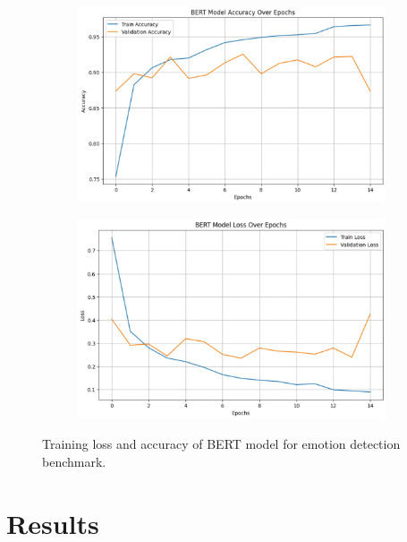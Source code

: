 \documentclass[conference]{IEEEtran}
\begin{document}
\begin{figure}[!htbp]
\centering
\captionsetup[subfigure]{justification=centering}
\captionsetup{justification=centering}

  \begin{subfigure}{0.48\linewidth}
  \centering
    \includegraphics[width=\linewidth]{bert_acc.jpg}
    \caption{}
    \label{plots:2-a}
  \end{subfigure}
  \hfill
  \begin{subfigure}{0.48\linewidth}
  \centering
    \includegraphics[width=\linewidth]{bert_loss.jpg}
    \caption{}
    \label{plots:2-b}
  \end{subfigure}

  \caption{Training loss and accuracy of BERT model for emotion detection benchmark.}
  \label{fig:baseline2}
\end{figure}

\section{Results}
\end{document}
